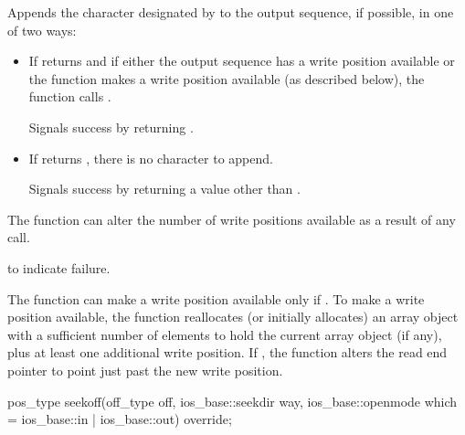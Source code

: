 \begin{itemdescr}
\pnum
\effects
Appends the character designated by  to the output
sequence, if possible, in one of two ways:
\begin{itemize}
\item
If
returns
and if either
the output sequence has a write position available or
the function makes a write position available
(as described below),
the function calls
.

Signals success by returning .

\item
If
returns
,
there is no character to append.

Signals success by returning a value other than
.
\end{itemize}

\pnum
\remarks
The function can alter the number of write positions available as a
result of any call.

\pnum
\returns
{}
to indicate failure.

\pnum
The function can make a write position available only if
.
To make a write position available,
the function reallocates (or initially allocates) an array object
with a sufficient number of elements to hold
the current array object (if any), plus
at least
one additional write position.
If
,
the function alters the read end pointer
to point just past the new write position.
\end{itemdescr}

%
\begin{itemdecl}
pos_type seekoff(off_type off, ios_base::seekdir way,
                 ios_base::openmode which
                   = ios_base::in | ios_base::out) override;
\end{itemdecl}


